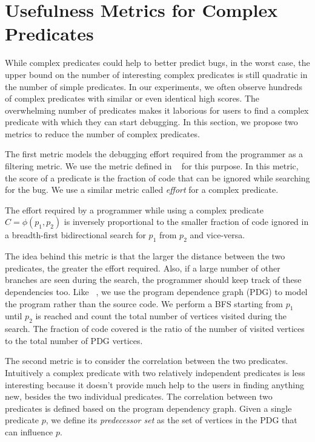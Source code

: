 
\section{Usefulness Metrics for Complex Predicates}
\label{sec-metrics}
While complex predicates could help to better predict bugs, in the worst case, the upper bound on the number of interesting complex predicates is still quadratic in the number of simple predicates.  In our experiments, we often observe hundreds of complex predicates with similar or even identical high scores.  The overwhelming number of predicates makes it laborious for users to find a complex predicate with which they can start debugging.  In this section, we propose two metrics to reduce the number of complex predicates.

The first metric models the debugging effort required from the programmer as a filtering metric.  We use the metric defined in ~\cite{1062522} for this purpose.  In this metric, the score of a predicate is the fraction of code that can be ignored while searching for the bug.  We use a similar metric called \emph{effort} for a complex predicate.

\begin{defn}
\label{dfn4}
The effort required by a programmer while using a complex predicate $C = \phi(p_1, p_2)$ is inversely proportional to the smaller fraction of code ignored in a breadth-first bidirectional search for $p_1$ from $p_2$ and vice-versa.
\end{defn}

The idea behind this metric is that the larger the distance between the two predicates, the greater the effort required.  Also, if a large number of other branches are seen during the search, the programmer should keep track of these dependencies too.  Like ~\cite{1062522}, we use the program dependence graph (PDG) to model the program rather than the source code. We perform a BFS starting from $p_1$ until $p_2$ is reached and count the total number of vertices visited during the search. The fraction of code covered is the ratio of the number of visited vertices to the total number of PDG vertices. 

The second metric is to consider the correlation between the two predicates.  Intuitively a complex predicate with two relatively independent predicates is less interesting because it doesn't provide much help to the users in finding anything new, besides the two individual predicates.  The correlation between two predicates is defined based on the program dependency graph.  Given a single predicate $p$, we define its \textit{predecessor set} as the set of vertices in the PDG that can influence $p$.

